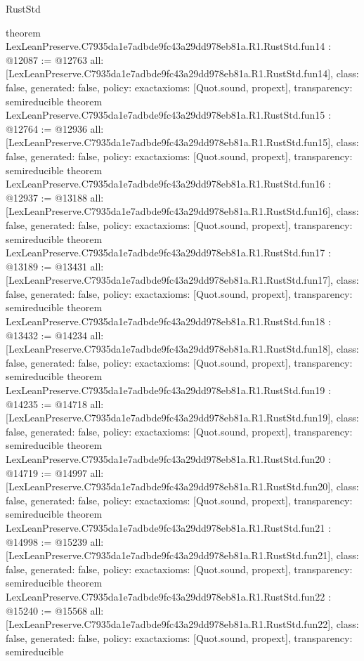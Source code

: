 \begin{lexlean}{RustStd}
\begin{coremodule}
{}
theorem LexLeanPreserve.C7935da1e7adbde9fc43a29dd978eb81a.R1.RustStd.fun14 : @12087 := @12763 {
  all: [LexLeanPreserve.C7935da1e7adbde9fc43a29dd978eb81a.R1.RustStd.fun14],
  class: false,
  generated: false,
  policy: exact{axioms: [Quot.sound, propext]},
  transparency: semireducible
}
theorem LexLeanPreserve.C7935da1e7adbde9fc43a29dd978eb81a.R1.RustStd.fun15 : @12764 := @12936 {
  all: [LexLeanPreserve.C7935da1e7adbde9fc43a29dd978eb81a.R1.RustStd.fun15],
  class: false,
  generated: false,
  policy: exact{axioms: [Quot.sound, propext]},
  transparency: semireducible
}
theorem LexLeanPreserve.C7935da1e7adbde9fc43a29dd978eb81a.R1.RustStd.fun16 : @12937 := @13188 {
  all: [LexLeanPreserve.C7935da1e7adbde9fc43a29dd978eb81a.R1.RustStd.fun16],
  class: false,
  generated: false,
  policy: exact{axioms: [Quot.sound, propext]},
  transparency: semireducible
}
theorem LexLeanPreserve.C7935da1e7adbde9fc43a29dd978eb81a.R1.RustStd.fun17 : @13189 := @13431 {
  all: [LexLeanPreserve.C7935da1e7adbde9fc43a29dd978eb81a.R1.RustStd.fun17],
  class: false,
  generated: false,
  policy: exact{axioms: [Quot.sound, propext]},
  transparency: semireducible
}
theorem LexLeanPreserve.C7935da1e7adbde9fc43a29dd978eb81a.R1.RustStd.fun18 : @13432 := @14234 {
  all: [LexLeanPreserve.C7935da1e7adbde9fc43a29dd978eb81a.R1.RustStd.fun18],
  class: false,
  generated: false,
  policy: exact{axioms: [Quot.sound, propext]},
  transparency: semireducible
}
theorem LexLeanPreserve.C7935da1e7adbde9fc43a29dd978eb81a.R1.RustStd.fun19 : @14235 := @14718 {
  all: [LexLeanPreserve.C7935da1e7adbde9fc43a29dd978eb81a.R1.RustStd.fun19],
  class: false,
  generated: false,
  policy: exact{axioms: [Quot.sound, propext]},
  transparency: semireducible
}
theorem LexLeanPreserve.C7935da1e7adbde9fc43a29dd978eb81a.R1.RustStd.fun20 : @14719 := @14997 {
  all: [LexLeanPreserve.C7935da1e7adbde9fc43a29dd978eb81a.R1.RustStd.fun20],
  class: false,
  generated: false,
  policy: exact{axioms: [Quot.sound, propext]},
  transparency: semireducible
}
theorem LexLeanPreserve.C7935da1e7adbde9fc43a29dd978eb81a.R1.RustStd.fun21 : @14998 := @15239 {
  all: [LexLeanPreserve.C7935da1e7adbde9fc43a29dd978eb81a.R1.RustStd.fun21],
  class: false,
  generated: false,
  policy: exact{axioms: [Quot.sound, propext]},
  transparency: semireducible
}
theorem LexLeanPreserve.C7935da1e7adbde9fc43a29dd978eb81a.R1.RustStd.fun22 : @15240 := @15568 {
  all: [LexLeanPreserve.C7935da1e7adbde9fc43a29dd978eb81a.R1.RustStd.fun22],
  class: false,
  generated: false,
  policy: exact{axioms: [Quot.sound, propext]},
  transparency: semireducible
}
\end{coremodule}
\end{lexlean}
